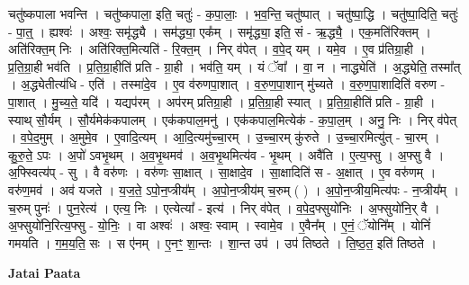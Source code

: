 \documentclass[17pt]{extarticle}
\begin{document}
चतु॑ष्कपाला भवन्ति । चतु॑ष्कपाला॒ इति॒ चतुः॑ - क॒पा॒लाः॒ । भ॒व॒न्ति॒ चतु॑ष्पात् । चतु॑ष्पा॒द्धि । चतु॑ष्पा॒दिति॒ चतुः॑ - पा॒त्॒ । ह्यश्वः॑ । अश्वः॒ समृ॑द्ध्यै । सम॑द्ध्या॒ एक᳚म् । समृ॑द्ध्या॒ इति॒ सं - ऋ॒द्ध्यै॒ । एक॒मति॑रिक्तम् । अति॑रिक्त॒म् निः । अति॑रिक्त॒मित्यति॑ - रि॒क्त॒म् । निर् व॑पेत् । व॒पे॒द् यम् । यमे॒व । ए॒व प्र॑तिग्रा॒ही । प्र॒ति॒ग्रा॒ही भव॑ति । प्र॒ति॒ग्रा॒हीति॑ प्रति - ग्रा॒ही । भव॑ति॒ यम् । यं ॅवा᳚ । वा॒ न । नाद्ध्येति॑ । अ॒द्ध्येति॒ तस्मा᳚त् । अ॒द्ध्येतीत्य॑धि - एति॑ । तस्मा॑दे॒व । ए॒व व॑रुणपा॒शात् । व॒रु॒ण॒पा॒शान् मु॑च्यते । व॒रु॒ण॒पा॒शादिति॑ वरुण - पा॒शात् । मु॒च्य॒ते॒ यदि॑ । यद्यप॑रम् । अप॑रम् प्रतिग्रा॒ही । प्र॒ति॒ग्रा॒ही स्यात् । प्र॒ति॒ग्रा॒हीति॑ प्रति - ग्रा॒ही । स्याथ् सौ॒र्यम् । सौ॒र्यमेक॑कपालम् । एक॑कपाल॒मनु॑ । एक॑कपाल॒मित्येक॑ - क॒पा॒ल॒म् । अनु॒ निः । निर् व॑पेत् । व॒पे॒द॒मुम् । अ॒मुमे॒व । ए॒वादि॒त्यम् । आ॒दि॒त्यमु॑च्चा॒रम् । उ॒च्चा॒रम् कु॑रुते । उ॒च्चा॒रमित्यु॑त् - चा॒रम् । कु॒रु॒ते॒ ऽपः । अ॒पो॑ ऽवभृ॒थम् । अ॒व॒भृ॒थमव॑ । अ॒व॒भृ॒थमित्य॑व - भृ॒थम् । अवै॑ति । ए॒त्य॒फ्सु । अ॒फ्सु वै । अ॒फ्स्वित्य॑प् - सु । वै वरु॑णः । वरु॑णः सा॒क्षात् । सा॒क्षादे॒व । सा॒क्षादिति॑ स - अ॒क्षात् । ए॒व वरु॑णम् । वरु॑ण॒मव॑ । अव॑ यजते । य॒ज॒ते॒ ऽपो॒न॒प्त्रीय᳚म् । अ॒पो॒न॒प्त्रीय॑म् च॒रुम् ( ) । अ॒पो॒न॒प्त्रीय॒मित्य॑पः - न॒प्त्रीय᳚म् । च॒रुम् पुनः॑ । पुन॒रेत्य॑ । एत्य॒ निः । एत्येत्या᳚ - इत्य॑ । निर् व॑पेत् । व॒पे॒द॒फ्सुयो॑निः । अ॒फ्सुयो॑नि॒र् वै । अ॒फ्सुयो॑नि॒रित्य॒फ्सु - यो॒निः॒ । वा अश्वः॑ । अश्वः॒ स्वाम् । स्वामे॒व । ए॒वैन᳚म् । ए॒नं॒ ॅयोनि᳚म् । योनिं॑ गमयति । ग॒म॒य॒ति॒ सः । स ए॑नम् । ए॒नꣳ॒॒ शा॒न्तः । शा॒न्त उप॑ । उप॑ तिष्ठते । ति॒ष्ठ॒त॒ इति॑ तिष्ठते । \newline

\textbf{Jatai Paata} \newline
\end{document}
